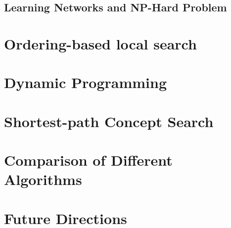 \documentclass[a4paper,12pt]{article}
\begin{document}
\subsection{Learning Networks and NP-Hard Problem }

\section{Ordering-based local search }


\section{Dynamic Programming}

\section{Shortest-path Concept Search}

\section{Comparison of Different Algorithms}
\section{Future Directions}

\begin{thebibliography}{99}
\end{thebibliography}






\end{document}
